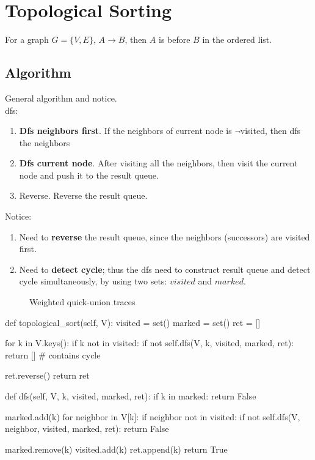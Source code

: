 \section{Topological Sorting}
For a graph $G=\{V, E\}$, $ A \rightarrow B $, then $A$ is before $B$ in the ordered list. 
\subsection{Algorithm}
General algorithm and notice.\\
 
dfs:
\begin{enumerate}
\item \textbf{Dfs neighbors first}. If the neighbors of current node is  $\neg$visited, then dfs the neighbors
\item \textbf{Dfs current node}. After visiting all the neighbors, then visit the current node and push it to the result queue.
\item Reverse. Reverse the result queue. 
\end{enumerate}

Notice:
\begin{enumerate}
\item Need to \textbf{reverse} the result queue, since the neighbors (successors) are visited first. 
\item Need to \textbf{detect cycle}; thus the dfs need to construct result queue and detect cycle simultaneously, by using two sets: $visited$ and $marked$. 
\end{enumerate}
\begin{figure}[hbtp]
\centering
\subfloat{\texttt{[image: uf]}}
\caption{Weighted quick-union traces}
\label{fig:union_find}
\end{figure}
\begin{python}
def topological_sort(self, V):
    visited = set()
    marked = set()
    ret = []

    for k in V.keys():
        if k not in visited:
            if not self.dfs(V, k, visited, marked, ret):
                return []  # contains cycle 

    ret.reverse()
    return ret

def dfs(self, V, k, visited, marked, ret):
    if k in marked:
        return False

    marked.add(k)
    for neighbor in V[k]:
        if neighbor not in visited:
            if not self.dfs(V, neighbor, visited, marked, ret):
                return False

    marked.remove(k)
    visited.add(k)
    ret.append(k)
    return True
\end{python}

